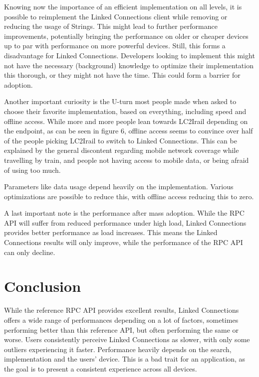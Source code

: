 \documentclass[twocolumn]{phdsymp} %
\begin{document}
Knowing now the importance of an efficient implementation on all levels, it is possible to reimplement the Linked Connections client while removing or reducing the usage of
Strings. This might lead to further performance improvements, potentially bringing the performance on older or cheaper devices up to par with performance on more powerful devices. Still, this forms a disadvantage for Linked Connections. Developers looking to implement this might not have the necessary (background) knowledge to optimize
their implementation this thorough, or they might not have the time. This could form a barrier for adoption.

Another important curiosity is the U-turn most people made when asked to choose their favorite implementation, based on everything, including speed and offline access.
While more and more people lean towards LC2Irail depending on the endpoint, as can be seen in figure 6, offline access seems to convince over half of the people picking LC2Irail to switch to Linked Connections. This can be explained by the general discontent regarding mobile network coverage while travelling by train, and people not having access to mobile data, or being afraid of using too much.

Parameters like data usage depend heavily on the implementation. Various optimizations are possible to reduce this, with offline access reducing this to zero.

A last important note is the performance after mass adoption. While the \textsc{RPC} API will suffer from reduced performance under high load, Linked Connections provides better performance as load increases. This means the Linked Connections results will only improve, while the performance of the \textsc{RPC} API can only decline.

\section{Conclusion}
While the reference \textsc{RPC} API provides excellent results, Linked Connections offers a wide range of performances depending on a lot of factors, sometimes performing better than this reference API, but often performing the same or worse. Users consistently perceive Linked Connections as slower, with only some outliers experiencing it faster. Performance heavily depends on the search, implementation and the users’ device. This is a bad trait for an application, as the goal is to present a consistent experience across all devices.
\end{document}
